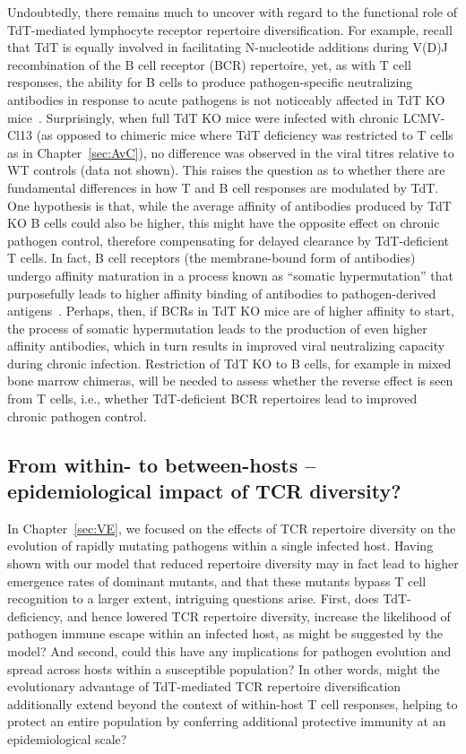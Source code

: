 Undoubtedly, there remains much to uncover with regard to the functional role of TdT-mediated lymphocyte receptor repertoire diversification. For example, recall that TdT is equally involved in facilitating N-nucleotide additions during V(D)J recombination of the B cell receptor (BCR) repertoire, yet, as with T cell responses, the ability for B cells to produce pathogen-specific neutralizing antibodies in response to acute pathogens is not noticeably affected in TdT KO mice~\cite{gilfillan1995efficient}. Surprisingly, when full TdT KO mice were infected with chronic LCMV-Cl13 (as opposed to chimeric mice where TdT deficiency was restricted to T cells as in Chapter~\ref{sec:AvC}), no difference was observed in the viral titres relative to WT controls (data not shown). This raises the question as to whether there are fundamental differences in how T and B cell responses are modulated by TdT. One hypothesis is that, while the average affinity of antibodies produced by TdT KO B cells could also be higher, this might have the opposite effect on chronic pathogen control, therefore compensating for delayed clearance by TdT-deficient T cells. In fact, B cell receptors (the membrane-bound form of antibodies) undergo affinity maturation in a process known as ``somatic hypermutation'' that purposefully leads to higher affinity binding of antibodies to pathogen-derived antigens~\cite{wagner1996somatic,meffre2001somatic,di2007molecular}. Perhaps, then, if BCRs in TdT KO mice are of higher affinity to start, the process of somatic hypermutation leads to the production of even higher affinity antibodies, which in turn results in improved viral neutralizing capacity during chronic infection. Restriction of TdT KO to B cells, for example in mixed bone marrow chimeras, will be needed to assess whether the reverse effect is seen from T cells, i.e., whether TdT-deficient BCR repertoires lead to improved chronic pathogen control.

\subsection{From within- to between-hosts -- epidemiological impact of TCR diversity?}

In Chapter~\ref{sec:VE}, we focused on the effects of TCR repertoire diversity on the evolution of rapidly mutating pathogens within a single infected host. Having shown with our model that reduced repertoire diversity may in fact lead to higher emergence rates of dominant mutants, and that these mutants bypass T cell recognition to a larger extent, intriguing questions arise. First, does TdT-deficiency, and hence lowered TCR repertoire diversity, increase the likelihood of pathogen immune escape within an infected host, as might be suggested by the model? And second, could this have any implications for pathogen evolution and spread across hosts within a susceptible population? In other words, might the evolutionary advantage of TdT-mediated TCR repertoire diversification additionally extend beyond the context of within-host T cell responses, helping to protect an entire population by conferring additional protective immunity at an epidemiological scale?

